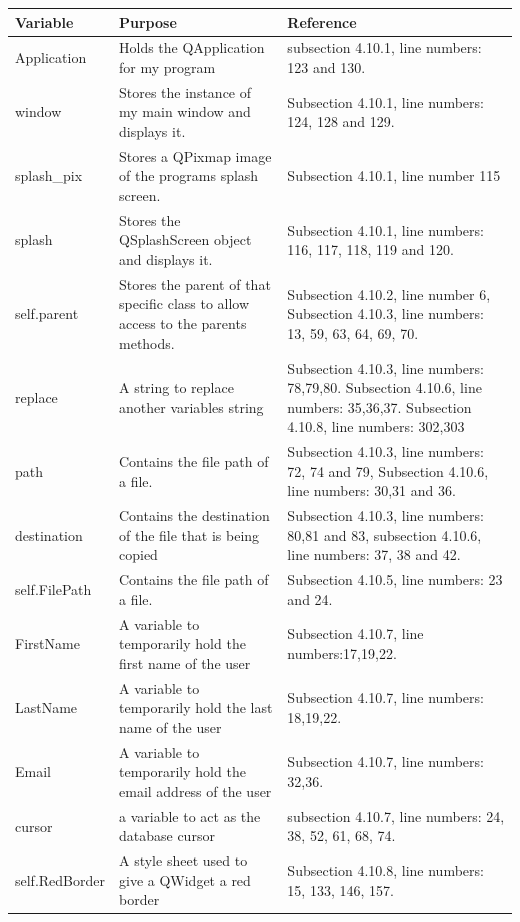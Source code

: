 \begin{center}
\begin{longtable}{|p{5cm}|p{6cm}|p{3.5cm}|} \hline
\textbf{Variable} & \textbf{Purpose} & \textbf{Reference} \\ \hline
Application & Holds the QApplication for my program & subsection 4.10.1, line numbers: 123 and 130. \\ \hline
window & Stores the instance of my main window and displays it. & Subsection 4.10.1, line numbers: 124, 128 and 129. \\ \hline
splash\_pix & Stores a QPixmap image of the programs splash screen. & Subsection 4.10.1, line number 115 \\ \hline
splash & Stores the QSplashScreen object and displays it. & Subsection 4.10.1, line numbers: 116, 117, 118, 119 and 120. \\ \hline
self.parent & Stores the parent of that specific class to allow access to the parents methods. & Subsection 4.10.2, line number 6, Subsection 4.10.3, line numbers: 13, 59, 63, 64, 69, 70. \\ \hline
replace & A string to replace another variables string & Subsection 4.10.3, line numbers: 78,79,80. Subsection 4.10.6, line numbers: 35,36,37. Subsection 4.10.8, line numbers: 302,303 \\ \hline
path & Contains the file path of a file. & Subsection 4.10.3, line numbers: 72, 74 and 79, Subsection 4.10.6, line numbers: 30,31 and 36. \\ \hline
destination & Contains the destination of the file that is being  copied & Subsection 4.10.3, line numbers: 80,81 and 83, subsection 4.10.6, line numbers: 37, 38 and 42. \\ \hline
self.FilePath &  Contains the file path of a file. & Subsection 4.10.5, line numbers: 23 and 24. \\ \hline
FirstName & A variable to temporarily hold the first name of the user & Subsection 4.10.7, line numbers:17,19,22. \\ \hline
LastName & A variable to temporarily hold the last name of the user & Subsection 4.10.7, line numbers: 18,19,22. \\ \hline
Email & A variable to temporarily hold the email address of the user & Subsection 4.10.7, line numbers: 32,36. \\ \hline
cursor & a variable to act as the database cursor & subsection 4.10.7, line numbers: 24, 38, 52, 61, 68, 74. \\ \hline
self.RedBorder & A style sheet used to give a QWidget a red border & Subsection 4.10.8, line numbers: 15, 133, 146, 157. \\ \hline

\end{longtable}
\end{center}
